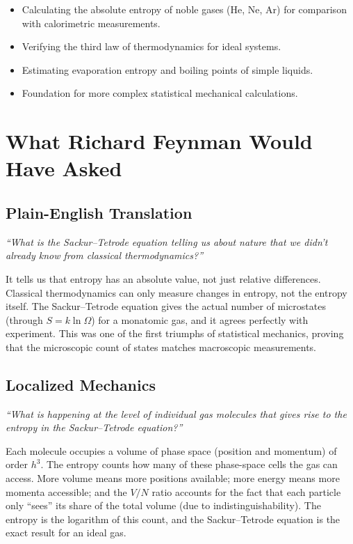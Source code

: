 \documentclass[11pt,openright]{book}
\begin{document}
\begin{itemize}
    \item Calculating the absolute entropy of noble gases (He, Ne, Ar) for comparison with calorimetric measurements.
    \item Verifying the third law of thermodynamics for ideal systems.
    \item Estimating evaporation entropy and boiling points of simple liquids.
    \item Foundation for more complex statistical mechanical calculations.
\end{itemize}
\section*{What Richard Feynman Would Have Asked}

\subsection*{Plain-English Translation}
\textit{``What is the Sackur--Tetrode equation telling us about nature that we didn't already know from classical thermodynamics?''}

It tells us that entropy has an absolute value, not just relative differences. Classical thermodynamics can only measure changes in entropy, not the entropy itself. The Sackur--Tetrode equation gives the actual number of microstates (through $S = k\ln\Omega$) for a monatomic gas, and it agrees perfectly with experiment. This was one of the first triumphs of statistical mechanics, proving that the microscopic count of states matches macroscopic measurements.

\subsection*{Localized Mechanics}
\textit{``What is happening at the level of individual gas molecules that gives rise to the entropy in the Sackur--Tetrode equation?''}

Each molecule occupies a volume of phase space (position and momentum) of order $h^3$. The entropy counts how many of these phase-space cells the gas can access. More volume means more positions available; more energy means more momenta accessible; and the $V/N$ ratio accounts for the fact that each particle only ``sees'' its share of the total volume (due to indistinguishability). The entropy is the logarithm of this count, and the Sackur--Tetrode equation is the exact result for an ideal gas.
\end{document}
